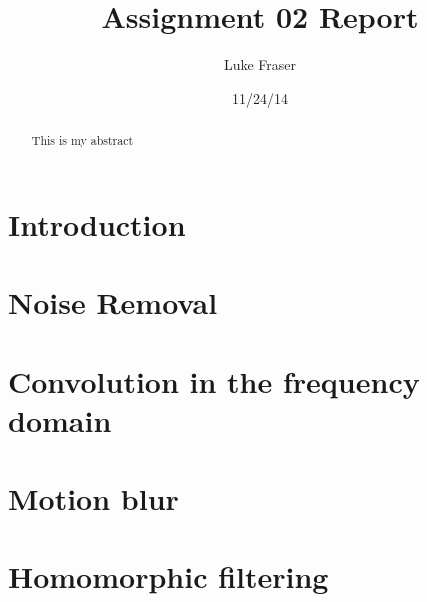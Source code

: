 \documentclass[letterpaper]{article}
\title{Assignment 02 Report}
\author{Luke Fraser}
\date{11/24/14}
\begin{document}
\maketitle
\begin{abstract}
This is my abstract
\end{abstract}

\section{Introduction}
\section{Noise Removal}
\section{Convolution in the frequency domain}
\section{Motion blur}
\section{Homomorphic filtering}
  
\end{document}
